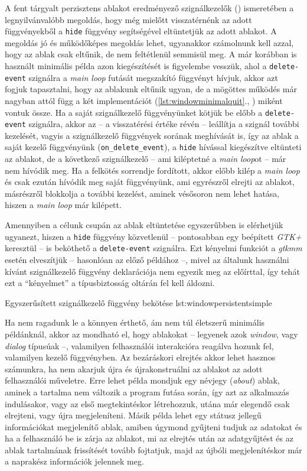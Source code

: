 A fent tárgyalt perzisztens ablakot eredményező szignálkezelők () ismeretében a legnyilvánvalóbb megoldás, hogy még mielőtt visszatérnénk az adott függvényekből a \texttt{hide} függvény segítségével eltüntetjük az adott ablakot. A megoldás jó és működőképes megoldás lehet, ugyanakkor számolnunk kell azzal, hogy az ablak csak eltűnik, de nem feltétlenül semmisül meg. A már korábban is használt minimális példa azon kiegészítését is figyelembe vesszük, ahol a \texttt{delete-event} szignálra a \textit{main loop} futását megszakító függvényt hívjuk, akkor azt fogjuk tapasztalni, hogy az ablakunk eltűnik ugyan, de a mögöttes működés már nagyban attól függ a két implementációt (\ref{lst:windowminimalquit}., ) miként vontuk össze. Ha a saját szignálkezelő függvényünket kötjük be előbb a \texttt{delete-event} szignálra, akkor az -- a visszatérési értéke révén -- leállítja a szignál további kezelését, vagyis a szignálkezelő függvények sorának meghívását is, így az ablak a saját kezelő függvényünk (\texttt{on\_delete\_event}), a \texttt{hide} hívással kiegészítve eltünteti az ablakot, de a következő szignálkezelő -- ami kiléptetné a \textit{main loop}ot -- már nem hívódik meg. Ha a felkötés sorrendje fordított, akkor előbb kilép a \textit{main loop} és csak ezután hívódik meg saját függvényünk, ami egyrészről elrejti az ablakot, másrészről blokkolja a további kezelést, aminek vésősoron nem lehet hatása, hiszen a \textit{main loop} már kilépett.

Amennyiben a célunk csupán az ablak eltüntetése egyszerűbben is elérhetjük ugyanezt, hiszen a \texttt{hide} függvény közvetlenül -- pontosabban egy beépített \textit{GTK+} keresztül -- is beköthető a \texttt{delete-event} szignálra. Ezt kényelmi funkciót a \textit{gtkmm} esetén elveszítjük -- hasonlóan az előző példához --, mivel az általunk használni kívánt szignálkezelő függvény deklarációja nem egyezik meg az előírttal, így tehát ezt a ``kényelmet'' a típusbiztosság oltárán fel kell áldozni.

{Egyszerűsített szignálkezelő függvény bekötése}
{lst:windowpersistentsimple}

Ha nem ragadunk le a könnyen érthető, ám nem túl életszerű minimális példánknál, akkor az mondható el, hogy ablakokat -- legyenek azok \textit{window}, vagy \textit{dialog} típusúak --, valamilyen felhasználói interakcióra reagálva hozunk fel, valamilyen kezelő függvényben. Az bezáráskori elrejtés akkor lehet hasznos számunkra, ha nem akarjuk újra és újrakonstruálni az ablakot az adott felhasználói műveletre. Erre lehet példa mondjuk egy névjegy (\textit{about}) ablak, aminek a tartalma nem változik a program futása során, így azt az alkalmazás indulásakor, vagy az első megtekintéskor létrehozzuk, utána már elegendő csak elrejteni, vagy újra megjeleníteni. Másik példa lehet egy státusz jellegű információkat megjelenítő ablak, amiben úgymond gyűjteni tudjuk az adatokat és ha a felhasználó be is zárja az ablakot, mi az elrejtés után az adatgyűjtést és az ablak tartalmának frissítését tovább fojtatjuk, majd az újbóli megjelenítéskor már a naprakész információk jelennek meg.

